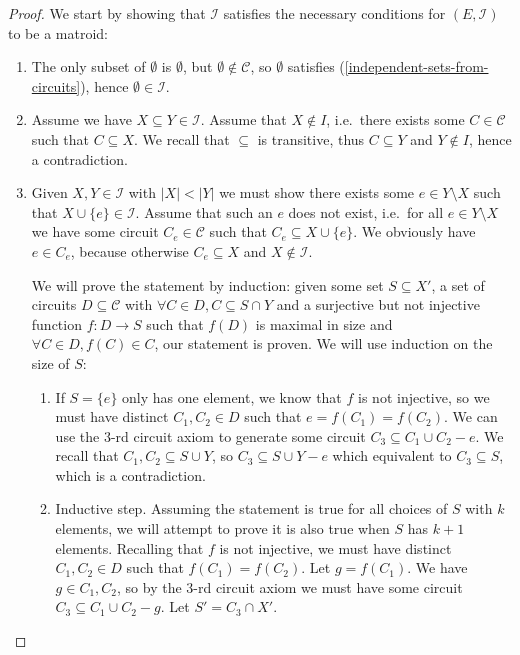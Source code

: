 \begin{proof} We start by showing that $\mathcal I $ satisfies the necessary conditions for $(E, \mathcal I )$ to be a matroid:
    \begin{enumerate} 
        \item The only subset of $\emptyset $ is $ \emptyset $, but $ \emptyset \not\in \mathcal C $, so $ \emptyset $ satisfies (\ref{independent-sets-from-circuits}), hence $\emptyset \in \mathcal I$.
    \item Assume we have $X \subseteq Y \in \mathcal I$. Assume that $X \not\in I$, i.e.\ there exists some $C \in \mathcal C $ such that $C \subseteq X$. We recall that $\subseteq $ is transitive, thus $C \subseteq Y$ and $Y \not\in I$, hence a contradiction.
    \item Given $X, Y \in \mathcal I $ with $|X| < |Y|$ we must show there exists some $e \in Y \setminus X$ such that $X \cup \{e\} \in \mathcal I$. Assume that such an $e$ does not exist, i.e.\ for all $e \in Y \setminus X$ we have some circuit $C _e \in \mathcal C $ such that $C _e \subseteq X \cup \{e\}$. We obviously have $e \in C_e$, because otherwise $C_e \subseteq X$ and $X \not\in \mathcal I$.


             We will prove the statement by induction: given some set $S \subseteq X'$, a set of circuits $D \subseteq \mathcal C$ with $\forall C \in D, C \subseteq  S \cap Y$ and a surjective but not injective function $f : D \to S$ such that $f(D)$ is maximal in size and $\forall C \in D, f(C) \in C$, our statement is proven. We will use induction on the size of $S$:
    \begin{enumerate}
        \item If $S = \{e\}$ only has one element, we know that $f$ is not injective, so we must have distinct $C _1, C _2 \in D$ such that $e = f(C _1 ) = f(C _2)$. We can use the $3$-rd circuit axiom to generate some circuit $C _3 \subseteq C _1 \cup C _2 - e$. We recall that $C _1 , C _2 \subseteq S \cup Y $, so $C _3 \subseteq S \cup Y - e$ which equivalent to $C _3 \subseteq S$, which is a contradiction.
        \item Inductive step. Assuming the statement is true for all choices of $S$ with $k$ elements, we will attempt to prove it is also true when $S$ has $k + 1$ elements. Recalling that $f$ is not injective, we must have distinct $C _1, C _2 \in D$ such that $f(C _1 ) = f(C _2)$. Let $g = f(C _1)$. We have $g \in C _1, C _2$, so by the $3$-rd circuit axiom we must have some circuit $C  _3 \subseteq C _1 \cup C _2 - g$. Let $S' = C _3 \cap X'$. 


\end{enumerate}
\end{enumerate}
\end{proof}
